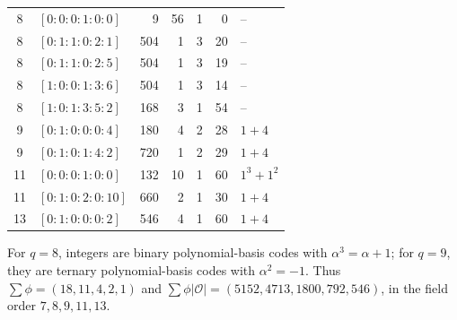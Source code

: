 \begin{longtable}{c l r r c r l}
8 & \([0:0:0:1:0:0]\) & 9 & 56 & 1 & 0 & --\\
8 & \([0:1:1:0:2:1]\) & 504 & 1 & 3 & 20 & --\\
8 & \([0:1:1:0:2:5]\) & 504 & 1 & 3 & 19 & --\\
8 & \([1:0:0:1:3:6]\) & 504 & 1 & 3 & 14 & --\\
8 & \([1:0:1:3:5:2]\) & 168 & 3 & 1 & 54 & --\\
9 & \([0:1:0:0:0:4]\) & 180 & 4 & 2 & 28 & \(1+4\)\\
9 & \([0:1:0:1:4:2]\) & 720 & 1 & 2 & 29 & \(1+4\)\\
11 & \([0:0:0:1:0:0]\) & 132 & 10 & 1 & 60 & \(1^3+1^2\)\\
11 & \([0:1:0:2:0:10]\) & 660 & 2 & 1 & 30 & \(1+4\)\\
13 & \([0:1:0:0:0:2]\) & 546 & 4 & 1 & 60 & \(1+4\)\\
\end{longtable}
\noindent For \(q=8\), integers are binary polynomial-basis codes
with \(\alpha^3=\alpha+1\); for \(q=9\), they are ternary
polynomial-basis codes with \(\alpha^2=-1\).  Thus
\(\sum\phi=(18, 11, 4, 2, 1)\) and
\(\sum\phi|\mathcal O|=(5152, 4713, 1800, 792, 546)\),
in the field order \(7,8,9,11,13\).
